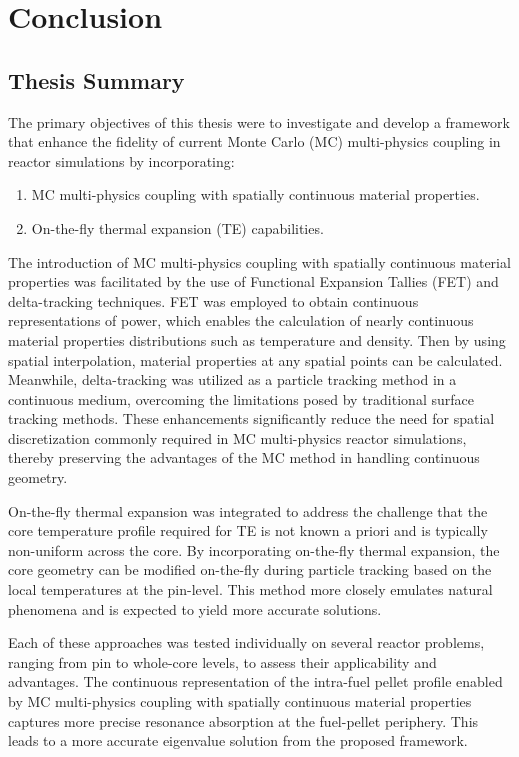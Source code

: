 \section{Conclusion}  \label{s5}

\subsection{Thesis Summary}

The primary objectives of this thesis were to investigate and develop a framework that enhance the fidelity of current Monte Carlo (MC) multi-physics coupling in reactor simulations by incorporating:
\begin{enumerate}
    \item MC multi-physics coupling with spatially continuous material properties.
    \item On-the-fly thermal expansion (TE) capabilities.
\end{enumerate}

The introduction of MC multi-physics coupling with spatially continuous material properties was facilitated by the use of Functional Expansion Tallies (FET) and delta-tracking techniques. FET was employed to obtain continuous representations of power, which enables the calculation of nearly continuous material properties distributions such as temperature and density. Then by using spatial interpolation, material properties at any spatial points can be calculated. Meanwhile, delta-tracking was utilized as a particle tracking method in a continuous medium, overcoming the limitations posed by traditional surface tracking methods. These enhancements significantly reduce the need for spatial discretization commonly required in MC multi-physics reactor simulations, thereby preserving the advantages of the MC method in handling continuous geometry.

On-the-fly thermal expansion was integrated to address the challenge that the core temperature profile required for TE is not known a priori and is typically non-uniform across the core. By incorporating on-the-fly thermal expansion, the core geometry can be modified on-the-fly during particle tracking based on the local temperatures at the pin-level. This method more closely emulates natural phenomena and is expected to yield more accurate solutions.

Each of these approaches was tested individually on several reactor problems, ranging from pin to whole-core levels, to assess their applicability and advantages. The continuous representation of the intra-fuel pellet profile enabled by MC multi-physics coupling with spatially continuous material properties captures more precise resonance absorption at the fuel-pellet periphery. This leads to a more accurate eigenvalue solution from the proposed framework.

